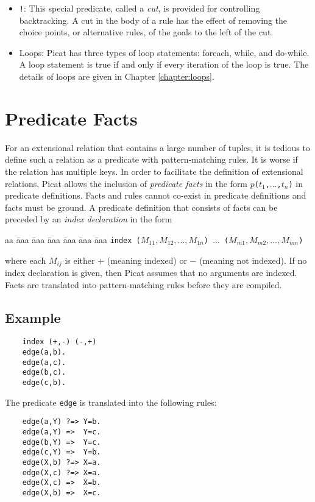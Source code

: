 \begin{itemize}
\item \verb+!+: This special predicate, called a \textit{cut}, is provided for controlling backtracking. A cut in the body of a rule has the effect of removing the choice points, or alternative rules, of the goals to the left of the cut. 

\item Loops: Picat has three types of loop statements: foreach, while, and do-while.  A loop statement is true if and only if every iteration of the loop is true. The details of loops are given in Chapter \ref{chapter:loops}.
\end{itemize}

\section{Predicate Facts}
For an extensional relation that contains a large number of tuples, it is tedious to define such a relation as a predicate with pattern-matching rules. It is worse if the relation has multiple keys. In order to facilitate the definition of extensional relations, Picat allows the inclusion of \emph{predicate facts} in the form \texttt{$p$($t_1$,$\ldots$,$t_n$)} in predicate definitions. Facts and rules cannot co-exist in predicate definitions and facts must be ground. A predicate definition that consists of facts can be preceded by an \emph{index declaration} in the form 
\begin{tabbing}
aa \= aaa \= aaa \= aaa \= aaa \= aaa \= aaa \kill
\> \texttt{index ($M_{11},M_{12},\ldots,M_{1n}$) $\ldots$ ($M_{m1},M_{m2},\ldots,M_{mn}$)} 
\end{tabbing}
where each $M_{ij}$ is either $+$ (meaning indexed) or $-$ (meaning not indexed). If no index declaration is given, then Picat assumes that no arguments are indexed. Facts are translated into pattern-matching rules before they are compiled. 

\subsection*{Example}
\begin{verbatim}
    index (+,-) (-,+)
    edge(a,b).
    edge(a,c).
    edge(b,c).
    edge(c,b).
\end{verbatim}
The predicate \texttt{edge} is translated into the following rules:
\begin{verbatim}
    edge(a,Y) ?=> Y=b.
    edge(a,Y) =>  Y=c.
    edge(b,Y) =>  Y=c.
    edge(c,Y) =>  Y=b.
    edge(X,b) ?=> X=a.
    edge(X,c) ?=> X=a.
    edge(X,c) =>  X=b.
    edge(X,b) =>  X=c.
\end{verbatim}

